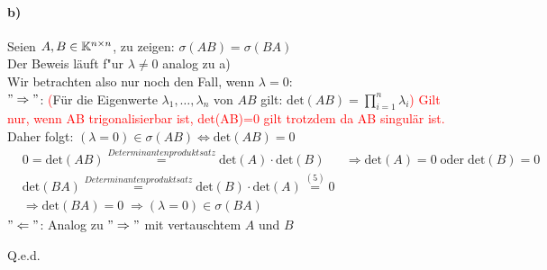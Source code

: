 \paragraph*{b)}
Seien $A,B \in \mathbb K^{n\times n}$, zu zeigen: $\sigma(AB) = \sigma(BA)$\\
\newline
Der Beweis l\"auft f"ur $\lambda \neq 0$ analog zu a)\\
Wir betrachten also nur noch den Fall, wenn $\lambda = 0$:\\
\newline
$"\Rightarrow"$:
\textcolor{red}(F\"ur die Eigenwerte $\lambda_1, \dots,\lambda_n$ von $AB$ gilt: $\mathrm{det}(AB)=\prod_{i=1}^{n}\lambda_i$\textcolor{red}{) Gilt nur, wenn  AB trigonalisierbar ist, det(AB)=0 gilt trotzdem da AB singul\"ar ist.}\\
Daher folgt: $(\lambda = 0) \in \sigma(AB)\Leftrightarrow \mathrm{det}(AB)=0$\\
\begin{align}
&0=\mathrm{det}(AB)\overset{Determinantenproduktsatz}{=}\mathrm{det}(A)\cdot \mathrm{det}(B)
&\Rightarrow \mathrm{det}(A)=0\; \mathrm{oder}\; \mathrm{det}(B)=0\\
&\mathrm{det}(BA)\overset{Determinantenproduktsatz}{=}\mathrm{det}(B)\cdot \mathrm{det}(A)\overset{(5)}{=}0\\
&\Rightarrow \mathrm{det}(BA)=0 \;\Rightarrow (\lambda = 0) \in \sigma(BA)
\end{align}
$"\Leftarrow"$: Analog zu $"\Rightarrow"$ mit vertauschtem $A$ und $B$\begin{flushright}Q.e.d.\end{flushright}

